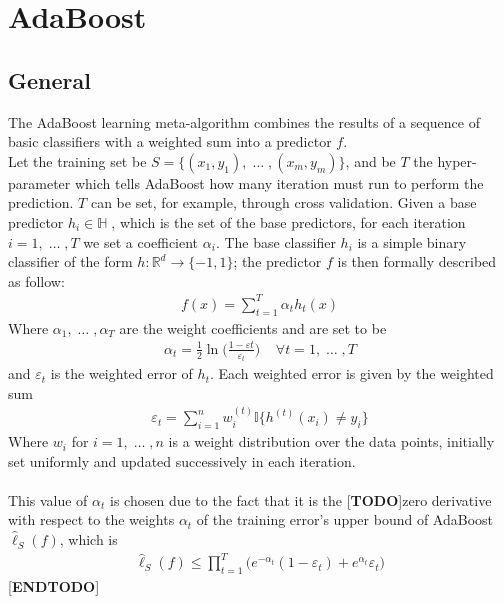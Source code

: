 
\chapter{AdaBoost}
\section{General}
\label{sec:adaboost_general}
	The AdaBoost learning meta-algorithm combines the results of a sequence of basic classifiers with a weighted sum into a predictor $f$. \\
	Let the training set be $S=\lbrace (x_{1}, y_{1}),\; \dots\;, (x_{m}, y_{m}) \rbrace$, and be $T$ the hyper-parameter which tells AdaBoost how many iteration must run to perform the prediction. $T$ can be set, for example, through cross validation. Given a base predictor $h_{i} \in \mathbb{H}\;$, which is the set of the base predictors, for each iteration $i = 1,\;\dots\;,T$ we set a coefficient $\alpha_{i}$. The base classifier $h_{i}$ is a simple binary classifier of the form $h:\mathbb{R}^{d}\to\lbrace-1, 1\rbrace$; the  predictor $f$ is then formally described as follow:
	\begin{align*}
		f(x) = \sum_{t=1}^{T}\alpha_{t}h_{t}(x)
	\end{align*}
	Where $\alpha_{1},\;\dots\;,\alpha_{T}$ are the weight coefficients and are set to be
	\begin{align}
		\label{eq:alpha_def}
		\alpha_{t} = \frac{1}{2}\ln \Big( \frac{1-\varepsilon{t}}{\varepsilon_{t}} \Big) \;\;\;\; \forall t=1,\;\dots\;,T
	\end{align}
	and $\varepsilon_{t}$ is the weighted error of $h_{t}$. Each weighted error is given by the weighted sum
	\begin{align*}
		\varepsilon_{t} = \sum_{i=1}^{n} w_{i}^{(t)}\mathbb{I}\big\lbrace h^{(t)}(x_{i}) \neq y_{i} \big\rbrace
	\end{align*}
	Where $w_{i}$ for $i = 1,\;\dots\;, n$ is a weight distribution over the data points, initially set uniformly and updated successively in each iteration.\\\\
	This value of $\alpha_{t}$ is chosen due to the fact that it is the [\textbf{TODO}]zero derivative with respect to the weights $\alpha_{t}$ of the training error's upper bound of AdaBoost $\hat{\ell}_{S}(f)$, which is
	\begin{align*}
		\hat{\ell}_{S}(f) \leq \prod_{t=1}^{T}\big( e^{-\alpha_{t}}(1-\varepsilon_{t}) + e^{\alpha_{t}}\varepsilon_{t} \big)
	\end{align*}
	[\textbf{ENDTODO}]

